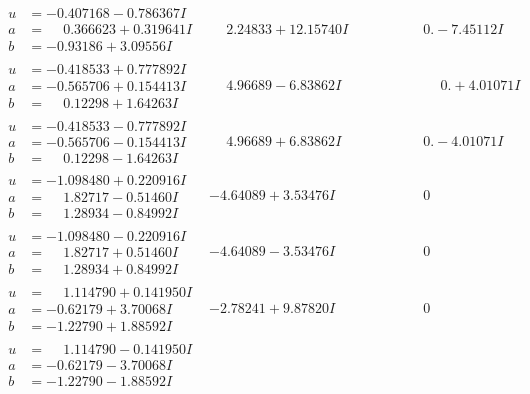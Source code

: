 \documentclass[1p]{elsarticle_modified}
\theoremstyle{definition}
\begin{document}
$$\begin{array}{c|c|c}
\begin{aligned}
u &= -0.407168 - 0.786367 I \\
a &= \phantom{-}0.366623 + 0.319641 I \\
b &= -0.93186 + 3.09556 I\end{aligned}
 & \phantom{-}2.24833 + 12.15740 I & \phantom{-0.000000 } 0. - 7.45112 I \\ \hline\begin{aligned}
u &= -0.418533 + 0.777892 I \\
a &= -0.565706 + 0.154413 I \\
b &= \phantom{-}0.12298 + 1.64263 I\end{aligned}
 & \phantom{-}4.96689 - 6.83862 I & \phantom{-0.000000 -}0. + 4.01071 I \\ \hline\begin{aligned}
u &= -0.418533 - 0.777892 I \\
a &= -0.565706 - 0.154413 I \\
b &= \phantom{-}0.12298 - 1.64263 I\end{aligned}
 & \phantom{-}4.96689 + 6.83862 I & \phantom{-0.000000 } 0. - 4.01071 I \\ \hline\begin{aligned}
u &= -1.098480 + 0.220916 I \\
a &= \phantom{-}1.82717 - 0.51460 I \\
b &= \phantom{-}1.28934 - 0.84992 I\end{aligned}
 & -4.64089 + 3.53476 I & \phantom{-0.000000 } 0 \\ \hline\begin{aligned}
u &= -1.098480 - 0.220916 I \\
a &= \phantom{-}1.82717 + 0.51460 I \\
b &= \phantom{-}1.28934 + 0.84992 I\end{aligned}
 & -4.64089 - 3.53476 I & \phantom{-0.000000 } 0 \\ \hline\begin{aligned}
u &= \phantom{-}1.114790 + 0.141950 I \\
a &= -0.62179 + 3.70068 I \\
b &= -1.22790 + 1.88592 I\end{aligned}
 & -2.78241 + 9.87820 I & \phantom{-0.000000 } 0 \\ \hline\begin{aligned}
u &= \phantom{-}1.114790 - 0.141950 I \\
a &= -0.62179 - 3.70068 I \\
b &= -1.22790 - 1.88592 I\end{aligned}

\end{array}$$
\end{document}
